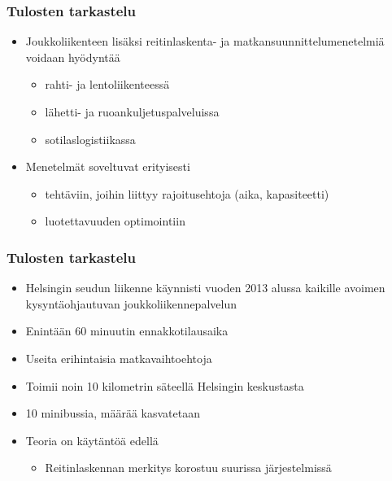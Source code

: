 \documentclass{beamer}
\begin{document}
\begin{frame}
  \frametitle{Tulosten tarkastelu}   %
\begin{itemize}
 \item 
Joukkoliikenteen lisäksi reitinlaskenta- ja matkansuunnittelumenetelmiä voidaan hyödyntää 
\begin{itemize}
\item
rahti- ja lentoliikenteessä
\item
lähetti- ja ruoankuljetuspalveluissa 
\item
sotilaslogistiikassa
 \end{itemize}
 \item
 Menetelmät soveltuvat erityisesti
 \begin{itemize}
  \item 
  tehtäviin, joihin liittyy rajoitusehtoja (aika, kapasiteetti)
  \item
  luotettavuuden optimointiin
 \end{itemize}
 \end{itemize}
\end{frame}



\begin{frame}
  \frametitle{Tulosten tarkastelu}   %
\begin{itemize}
 \item 
Helsingin seudun liikenne käynnisti vuoden 2013 alussa kaikille avoimen kysyntäohjautuvan joukkoliikennepalvelun
\item
Enintään 60 minuutin ennakkotilausaika
\item
Useita erihintaisia matkavaihtoehtoja
\item
Toimii noin 10 kilometrin säteellä Helsingin keskustasta
\item
10 minibussia, määrää kasvatetaan
\item
Teoria on käytäntöä edellä
\begin{itemize}
 \item 
 Reitinlaskennan merkitys korostuu suurissa järjestelmissä
\end{itemize}
 \end{itemize}
\end{frame}


\bgroup
{}
\begin{frame}[plain]{}
\end{frame}
\egroup
\end{document}
